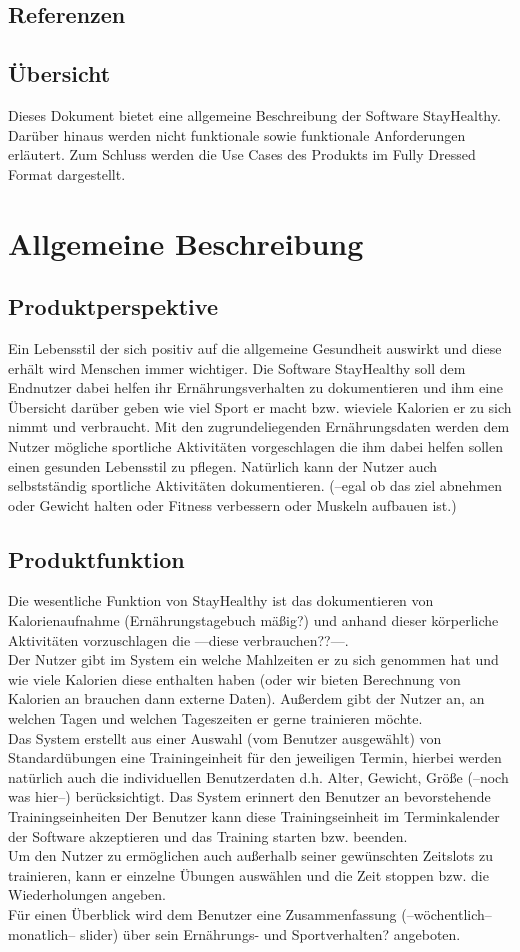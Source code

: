 \documentclass[12pt,a4paper,onecolumn]{article}
\begin{document}
\subsection{Referenzen}
\subsection{Übersicht}
Dieses Dokument bietet eine allgemeine Beschreibung der Software StayHealthy. Darüber hinaus werden nicht funktionale sowie funktionale Anforderungen erläutert. Zum Schluss werden die Use Cases des Produkts im Fully Dressed Format dargestellt.

\section{Allgemeine Beschreibung}
\subsection{Produktperspektive}
Ein Lebensstil der sich positiv auf die allgemeine Gesundheit auswirkt und diese erhält wird Menschen immer wichtiger. Die Software StayHealthy soll dem Endnutzer dabei helfen ihr Ernährungsverhalten zu dokumentieren und ihm eine Übersicht darüber geben wie viel Sport er macht bzw. wieviele Kalorien er zu sich nimmt und verbraucht. Mit den zugrundeliegenden Ernährungsdaten werden dem Nutzer mögliche sportliche Aktivitäten vorgeschlagen die ihm dabei helfen sollen einen gesunden Lebensstil zu pflegen. Natürlich kann der Nutzer auch selbstständig sportliche Aktivitäten dokumentieren. (--egal ob das ziel abnehmen oder Gewicht halten oder Fitness verbessern oder Muskeln aufbauen ist.)
\subsection{Produktfunktion}
Die wesentliche Funktion von StayHealthy ist das dokumentieren von Kalorienaufnahme (Ernährungstagebuch mäßig?) und anhand dieser körperliche Aktivitäten vorzuschlagen die ---diese verbrauchen??---.
\\Der Nutzer gibt im System ein welche Mahlzeiten er zu sich genommen hat und wie viele Kalorien diese enthalten haben (oder wir bieten Berechnung von Kalorien an brauchen dann externe Daten). Außerdem gibt der Nutzer an, an welchen Tagen und welchen Tageszeiten er gerne trainieren möchte. 
\\Das System erstellt aus einer Auswahl (vom Benutzer ausgewählt) von Standardübungen eine Trainingeinheit für den jeweiligen Termin, hierbei werden natürlich auch die individuellen Benutzerdaten d.h. Alter, Gewicht, Größe (--noch was hier--) berücksichtigt. Das System erinnert den Benutzer an bevorstehende Trainingseinheiten Der Benutzer kann diese Trainingseinheit im Terminkalender der Software akzeptieren und das Training starten bzw. beenden. \\Um den Nutzer zu ermöglichen auch außerhalb seiner gewünschten Zeitslots zu trainieren, kann er einzelne Übungen auswählen und die Zeit stoppen bzw. die Wiederholungen angeben. \\Für einen Überblick wird dem Benutzer eine Zusammenfassung (--wöchentlich--monatlich-- slider) über sein Ernährungs- und Sportverhalten? angeboten.
\end{document}
